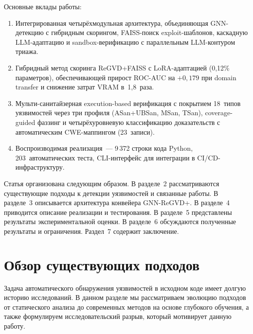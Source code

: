 \documentclass[runningheads]{llncs}
\begin{document}
Основные вклады работы:

\begin{enumerate}
    \item Интегрированная четырёхмодульная архитектура, объединяющая GNN-детекцию с гибридным скорингом, FAISS-поиск exploit-шаблонов, каскадную LLM-адаптацию и sandbox-верификацию с параллельным LLM-контуром триажа.
    \item Гибридный метод скоринга ReGVD+FAISS с LoRA-адаптацией (0,12\% параметров), обеспечивающей прирост ROC-AUC на $+0{,}179$ при domain transfer и снижение затрат VRAM в~1,8~раза.
    \item Мульти-санитайзерная execution-based верификация с покрытием 18~типов уязвимостей через три профиля (ASan+UBSan, MSan, TSan), coverage-guided фаззинг и четырёхуровневую классификацию доказательств с автоматическим CWE-маппингом (23~записи).
    \item Воспроизводимая реализация~--- 9\,372 строки кода Python, 203~автоматических теста, CLI-интерфейс для интеграции в CI/CD-инфраструктуру.
\end{enumerate}

Статья организована следующим образом. В разделе~2 рассматриваются существующие подходы к детекции уязвимостей и связанные работы. В разделе~3 описывается архитектура конвейера GNN-ReGVD+. В разделе~4 приводится описание реализации и тестирования. В разделе~5 представлены результаты экспериментальной оценки. В разделе~6 обсуждаются полученные результаты и ограничения. Раздел~7 содержит заключение.


\section{Обзор существующих подходов}

Задача автоматического обнаружения уязвимостей в исходном коде имеет долгую историю исследований. В данном разделе мы рассматриваем эволюцию подходов от статического анализа до современных методов на основе глубокого обучения, а также формулируем исследовательский разрыв, который мотивирует данную работу.
\end{document}

